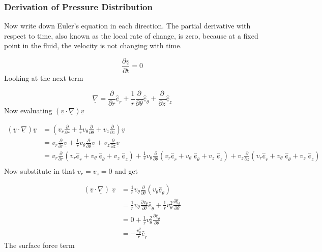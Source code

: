 \subsubsection{Derivation of Pressure Distribution}

Now write down Euler's equation in each direction.
The partial derivative with respect to time, also known as the local rate of change, is zero, because at a fixed point in the fluid, the velocity is not changing with time.

\begin{equation*}
  \frac{\partial\underline{v}}{\partial{}t}=0
\end{equation*}
Looking at the next term

\begin{equation*}
  \underline{\nabla}=\frac{\partial}{\partial{}r}\hat{\underline{e}}_{r}+\frac{1}{r}\frac{\partial}{\partial\theta}\hat{\underline{e}}_{\theta}+\frac{\partial}{\partial{}z}\hat{\underline{e}}_{z}
\end{equation*}
Now evaluating $(\underline{v}\cdot\underline{\nabla})\underline{v}$

\begin{equation*}
  \begin{split}
    (\underline{v}\cdot\underline{\nabla})\underline{v}&=
    \left(v_{r}\frac{\partial}{\partial{}r}+
    \frac{1}{r}v_{\theta}\frac{\partial}{\partial\theta}+
    v_{z}\frac{\partial}{\partial{}z}\right)\underline{v} \\
    &=v_{r}\frac{\partial}{\partial{}r}\underline{v}+
    \frac{1}{r}v_{\theta}\frac{\partial}{\partial\theta}\underline{v}+
    v_{z}\frac{\partial}{\partial{}z}\underline{v} \\
    &=v_{r}\frac{\partial}{\partial{}r}(v_{r}\hat{\underline{e}}_{r}+v_{\theta}\;\hat{\underline{e}}_{\theta}+v_{z}\;\hat{\underline{e}}_{z})
    +\frac{1}{r}v_{\theta}\frac{\partial}{\partial\theta}(v_{r}\hat{\underline{e}}_{r}+v_{\theta}\;\hat{\underline{e}}_{\theta}+v_{z}\;\hat{\underline{e}}_{z})
    +v_{z}\frac{\partial}{\partial{}z}(v_{r}\hat{\underline{e}}_{r}+v_{\theta}\;\hat{\underline{e}}_{\theta}+v_{z}\;\hat{\underline{e}}_{z}) \\
  \end{split}
\end{equation*}
Now substitute in that $v_{r}=v_{z}=0$ and get

\begin{equation*}
  \begin{split}
    (\underline{v}\cdot\underline{\nabla})\;\underline{v}
    &=\frac{1}{r}v_{\theta}\frac{\partial}{\partial\theta}(v_{\theta}\hat{\underline{e}}_{\theta}) \\
    &=\frac{1}{r}v_{\theta}\frac{\partial{}v_{\theta}}{\partial\theta}\hat{\underline{e}}_{\theta}+\frac{1}{r}v_{\theta}^{2}\frac{\partial\hat{\underline{e}}_{\theta}}{\partial\theta} \\
    &=0+\frac{1}{r}v_{\theta}^{2}\frac{\partial\hat{\underline{e}}_{\theta}}{\partial\theta} \\
    &=-\frac{v_{\theta}^{2}}{r}\hat{\underline{e}}_{r}
  \end{split}
\end{equation*}
The surface force term

